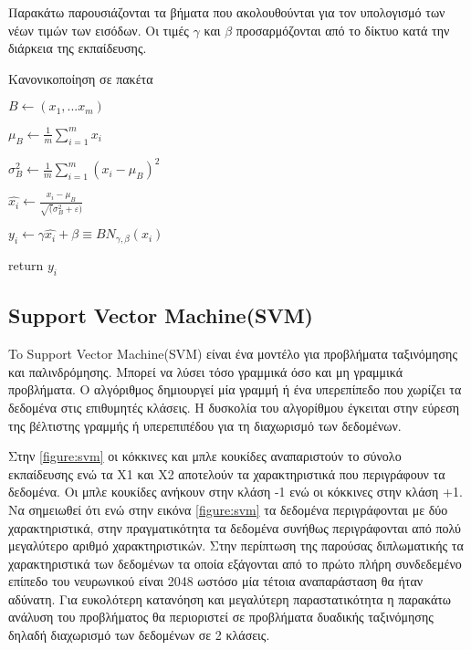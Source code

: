 Παρακάτω παρουσιάζονται τα βήματα που ακολουθούνται για τον υπολογισμό των νέων τιμών των εισόδων. Οι τιμές $\gamma$ και $\beta$ προσαρμόζονται από το δίκτυο κατά την διάρκεια της εκπαίδευσης.
 
 
\begin{algorithm}
  \caption{Κανονικοποίηση σε πακέτα}\label{alg:the_alg}

\begin{algorithmic}

\State $Β \gets (x_{1},...x_{m})$

\State $μ_{Β}\gets \frac{1}{m}\sum_{i=1}^{m} x_{i} $

\State $σ_{Β}^2\gets \frac{1}{m} \sum_{i=1}^{m} (x_{i}- μ_{Β})^2$

\State $\hat{x_{i}} \gets \frac{x_{i}-μ_{Β}}{\sqrt(σ_{Β}^2 + ε)}$

\State $y_{i} \gets \gamma \hat{x_{i}} + \beta  \equiv BN_{\gamma, \beta}(x_{i}) $

\State return $y_{i}$
\end{algorithmic}
\end{algorithm}





\subsection{Support Vector Machine(SVM)}
\label{subsec:3.1.4}

To Support Vector Machine(SVM) είναι ένα μοντέλο για προβλήματα ταξινόμησης και παλινδρόμησης. \cite{svm} Μπορεί να λύσει τόσο  γραμμικά όσο και μη γραμμικά  προβλήματα. Ο αλγόριθμος δημιουργεί μία γραμμή ή ένα υπερεπίπεδο που χωρίζει τα δεδομένα στις επιθυμητές κλάσεις. Η δυσκολία του αλγορίθμου έγκειται στην εύρεση της βέλτιστης γραμμής ή υπερεπιπέδου για τη διαχωρισμό των δεδομένων.  

Στην \ref{figure:svm} οι κόκκινες και μπλε κουκίδες αναπαριστούν το σύνολο εκπαίδευσης ενώ τα X1 και X2 αποτελούν τα χαρακτηριστικά που περιγράφουν τα δεδομένα. Οι μπλε κουκίδες ανήκουν στην κλάση -1 ενώ οι κόκκινες στην κλάση +1. Να σημειωθεί ότι ενώ στην εικόνα \ref{figure:svm} τα δεδομένα περιγράφονται με δύο χαρακτηριστικά, στην πραγματικότητα τα δεδομένα συνήθως περιγράφονται από πολύ μεγαλύτερο αριθμό χαρακτηριστικών. Στην περίπτωση της παρούσας διπλωματικής τα χαρακτηριστικά των δεδομένων τα οποία εξάγονται από το πρώτο πλήρη συνδεδεμένο επίπεδο του νευρωνικού είναι 2048 ωστόσο μία τέτοια αναπαράσταση θα ήταν αδύνατη. Για ευκολότερη κατανόηση και μεγαλύτερη παραστατικότητα η παρακάτω ανάλυση του προβλήματος θα περιοριστεί σε προβλήματα δυαδικής ταξινόμησης δηλαδή διαχωρισμό των δεδομένων σε 2 κλάσεις.



